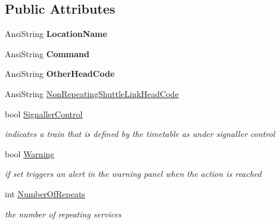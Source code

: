 \subsection*{Public Attributes}
\begin{DoxyCompactItemize}
\item 
\mbox{\label{class_t_action_vector_entry_afdc4364c8698998b3689039a32b8c148}} 
Ansi\+String {\bfseries Location\+Name}
\item 
\mbox{\label{class_t_action_vector_entry_a570ca952f6414e838be644082f02eed1}} 
Ansi\+String {\bfseries Command}
\item 
\mbox{\label{class_t_action_vector_entry_a0cce6ed92eea821583a661966baae024}} 
Ansi\+String {\bfseries Other\+Head\+Code}
\item 
Ansi\+String \mbox{\hyperlink{class_t_action_vector_entry_ae142e8e9d3a842c9b1d81bcd4e93e291}{Non\+Repeating\+Shuttle\+Link\+Head\+Code}}
\item 
\mbox{\label{class_t_action_vector_entry_a858aae4488b108f2e2771b1ef0e2905e}} 
bool \mbox{\hyperlink{class_t_action_vector_entry_a858aae4488b108f2e2771b1ef0e2905e}{Signaller\+Control}}
\begin{DoxyCompactList}\small\item\em indicates a train that is defined by the timetable as under signaller control \end{DoxyCompactList}\item 
\mbox{\label{class_t_action_vector_entry_a43fd46452123d72efc2bd9d10008b6f1}} 
bool \mbox{\hyperlink{class_t_action_vector_entry_a43fd46452123d72efc2bd9d10008b6f1}{Warning}}
\begin{DoxyCompactList}\small\item\em if set triggers an alert in the warning panel when the action is reached \end{DoxyCompactList}\item 
\mbox{\label{class_t_action_vector_entry_a5f4a663fd91b104c7f93990d79c16d1d}} 
int \mbox{\hyperlink{class_t_action_vector_entry_a5f4a663fd91b104c7f93990d79c16d1d}{Number\+Of\+Repeats}}
\begin{DoxyCompactList}\small\item\em the number of repeating services \end{DoxyCompactList}\item 

\end{DoxyCompactItemize}
